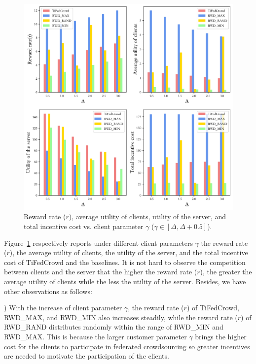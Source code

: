 \documentclass[final,1p,times]{elsarticle}
\begin{document}
\begin{figure}
	\centering
	\centerline{\includegraphics[width=5.5in]{fig2.pdf}}
	\caption{Reward rate ($r$), average utility of clients, utility of the server, and total incentive cost vs. client parameter $\gamma$ ($\gamma\in[\Delta,\Delta+0.5]$).}
	\label{fig:2}
\end{figure}

Figure~\ref{fig:2} respectively reports under different client parameters $\gamma$ the reward rate ($r$), the average utility of clients, the utility of the server, and the total incentive cost of TiFedCrowd and the baselines. It is not hard to observe the competition between  clients and the server that the higher the reward rate ($r$), the greater the average utility of clients while the less the utility of the server. Besides, we have other observations as follows: 

\lowercase{}) With the increase of client parameter $\gamma$, the reward rate ($r$) of TiFedCrowd, RWD\_MAX, and RWD\_MIN also increases steadily, while the reward rate ($r$) of RWD\_RAND distributes randomly within the range of RWD\_MIN and RWD\_MAX. This is because the larger customer parameter $\gamma$ brings the higher cost for the clients to participate in federated crowdsourcing so greater incentives are needed to motivate the participation of the clients.
\end{document}

